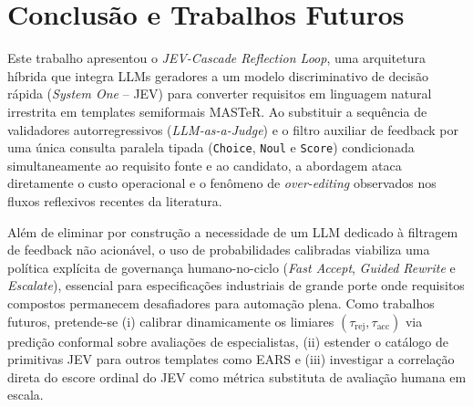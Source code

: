 \section{Conclusão e Trabalhos Futuros}

Este trabalho apresentou o \textit{JEV-Cascade Reflection Loop}, uma arquitetura híbrida que integra LLMs geradores a um modelo discriminativo de decisão rápida (\textit{System One} -- JEV) para converter requisitos em linguagem natural irrestrita em templates semiformais MASTeR. Ao substituir a sequência de validadores autorregressivos (\textit{LLM-as-a-Judge}) e o filtro auxiliar de feedback por uma única consulta paralela tipada (\texttt{Choice}, \texttt{Noul} e \texttt{Score}) condicionada simultaneamente ao requisito fonte e ao candidato, a abordagem ataca diretamente o custo operacional e o fenômeno de \textit{over-editing} observados nos fluxos reflexivos recentes da literatura.

Além de eliminar por construção a necessidade de um LLM dedicado à filtragem de feedback não acionável, o uso de probabilidades calibradas viabiliza uma política explícita de governança humano-no-ciclo (\textit{Fast Accept}, \textit{Guided Rewrite} e \textit{Escalate}), essencial para especificações industriais de grande porte onde requisitos compostos permanecem desafiadores para automação plena. Como trabalhos futuros, pretende-se (i) calibrar dinamicamente os limiares $(\tau_{\text{rej}}, \tau_{\text{acc}})$ via predição conformal sobre avaliações de especialistas, (ii) estender o catálogo de primitivas JEV para outros templates como EARS e (iii) investigar a correlação direta do escore ordinal do JEV como métrica substituta de avaliação humana em escala.
